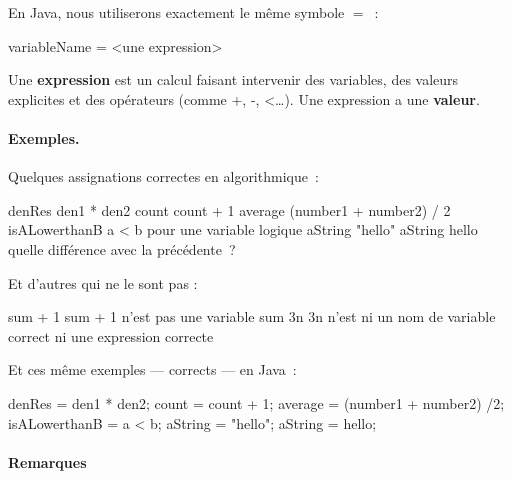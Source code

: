 			En Java, nous utiliserons exactement le même symbole $=$~:

			\begin{java}
variableName = <une expression>				
			\end{java}
				
			Une \textbf{expression} est un calcul faisant
			intervenir des variables, des valeurs explicites et des opérateurs
			(comme +, -, <\dots).  Une expression a une \textbf{valeur}.
					
			\paragraph{Exemples.}
				
				Quelques assignations correctes en algorithmique~:
				
				\begin{pseudocode}
					\Let denRes \Gets den1 * den2
					\Let count \Gets count + 1
					\Let average \Gets (number1 + number2) / 2
					\Let isALowerthanB \Gets a < b 
						\RComment pour une variable logique
					\Let aString \Gets "hello"
					\Let aString \Gets hello	
						\RComment quelle différence avec la précédente~? 
				\end{pseudocode}

				Et d’autres qui ne le sont pas :
			
				\begin{wrong}
					\begin{pseudocode}
					\Let sum + 1 \Gets 3
						\RComment sum + 1 n’est pas une variable
					\Let sum \Gets 3n
						\RComment 3n n’est ni un nom de variable correct 
						ni une expression correcte
					\end{pseudocode}
				\end{wrong}

				Et ces même exemples — corrects — en Java~:

				\begin{java}
denRes = den1 * den2;
count = count + 1;
average = (number1 + number2) /2;
isALowerthanB = a < b;
aString = "hello";
aString = hello;
				\end{java}
				
			\paragraph{Remarques}
			
